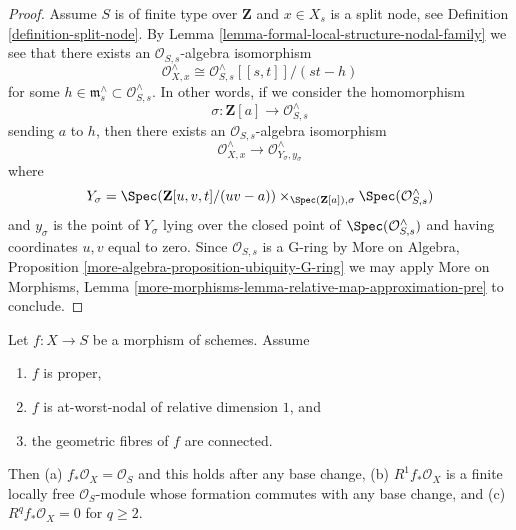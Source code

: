 \begin{proof}
\medskip\noindent
Assume $S$ is of finite type over $\mathbf{Z}$ and
$x \in X_s$ is a split node, see Definition \ref{definition-split-node}.
By Lemma \ref{lemma-formal-local-structure-nodal-family} we see that there
exists an $\mathcal{O}_{S, s}$-algebra isomorphism
$$
\mathcal{O}_{X, x}^\wedge \cong
\mathcal{O}_{S, s}^\wedge[[s, t]]/(st - h)
$$
for some $h \in \mathfrak m_s^\wedge \subset \mathcal{O}_{S, s}^\wedge$.
In other words, if we consider the homomorphism
$$
\sigma : \mathbf{Z}[a] \longrightarrow \mathcal{O}_{S, s}^\wedge
$$
sending $a$ to $h$, then there exists an $\mathcal{O}_{S, s}$-algebra
isomorphism
$$
\mathcal{O}_{X, x}^\wedge
\longrightarrow
\mathcal{O}_{Y_\sigma, y_\sigma}^\wedge
$$
where
$$
Y_\sigma = \Spec(\mathbf{Z}[u, v, t]/(uv - a))
\times_{\Spec(\mathbf{Z}[a]), \sigma} \Spec(\mathcal{O}_{S, s}^\wedge)
$$
and $y_\sigma$ is the point of $Y_\sigma$ lying over
the closed point of $\Spec(\mathcal{O}_{S, s}^\wedge)$
and having coordinates $u, v$ equal to zero. Since
$\mathcal{O}_{S, s}$ is a G-ring by
More on Algebra, Proposition \ref{more-algebra-proposition-ubiquity-G-ring}
we may apply More on Morphisms, Lemma
\ref{more-morphisms-lemma-relative-map-approximation-pre}
to conclude.
\end{proof}

\begin{lemma}
\label{lemma-genus-in-nodal-family-of-curves}
Let $f : X \to S$ be a morphism of schemes. Assume
\begin{enumerate}
\item $f$ is proper,
\item $f$ is at-worst-nodal of relative dimension $1$, and
\item the geometric fibres of $f$ are connected.
\end{enumerate}
Then (a) $f_*\mathcal{O}_X = \mathcal{O}_S$ and this holds after
any base change, (b) $R^1f_*\mathcal{O}_X$ is a finite locally free
$\mathcal{O}_S$-module whose formation commutes with any base change,
and (c) $R^qf_*\mathcal{O}_X = 0$ for $q \geq 2$.
\end{lemma}

